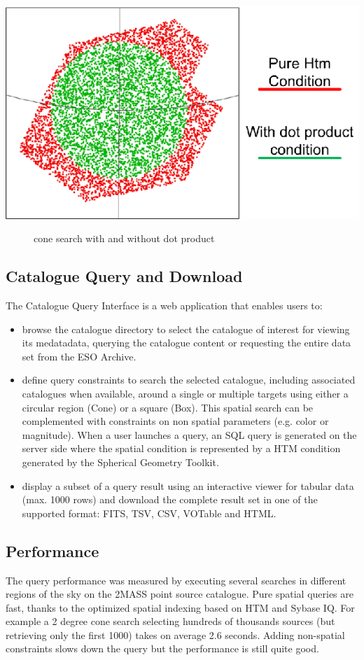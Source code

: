\documentclass[11pt,twoside]{article}
\begin{document}
\begin {center}
\includegraphics  [scale=0.8]{P64_2}
\begin{figure} [h]
\caption{cone search with and without dot product}
\end{figure}
\end {center}

\subsection{Catalogue Query and Download}
The Catalogue Query Interface is a web application that enables users to:
\begin{itemize}
\item browse the catalogue directory to select the catalogue of interest for viewing its medatadata, querying the catalogue content or
requesting the entire data set from the ESO Archive.
\item define query constraints to search the selected catalogue, including associated catalogues when available, around a single or multiple targets using either a circular region (Cone) or a square (Box). This spatial search can be complemented with constraints on non spatial parameters (e.g. color or magnitude). When a user launches a query, an SQL query is generated on the server side where the spatial condition is represented by a HTM condition generated by the Spherical Geometry Toolkit.
\item display a subset of a query result using an interactive viewer for tabular data (max. 1000 rows) and download the complete result set in one of the supported format: 
FITS, TSV, CSV, VOTable and HTML.
\end{itemize}

\subsection{Performance}
The query performance was measured by executing several searches in different regions of the sky on the 2MASS point source catalogue. Pure spatial queries are fast, thanks to the optimized spatial indexing based on HTM and Sybase IQ. For example a 2 degree cone search selecting hundreds of thousands sources (but retrieving only the first 1000) takes on average 2.6 seconds. Adding non-spatial constraints slows down the query but the performance is still quite good.
\end{document}
